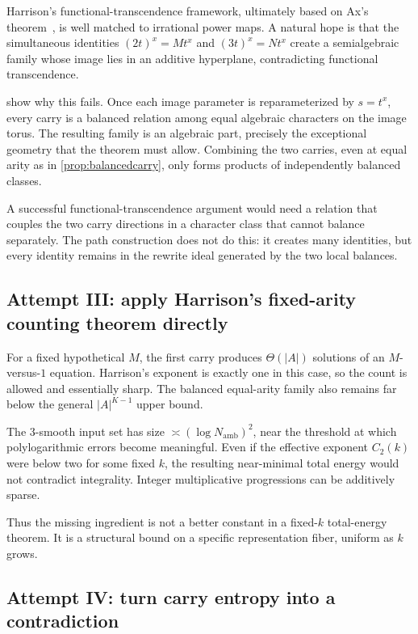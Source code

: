\documentclass[11pt,oneside]{article}
\theoremstyle{definition}
\begin{document}
Harrison's functional-transcendence framework, ultimately based on Ax's theorem~\cite{Ax1971,Harrison2026}, is well matched to irrational power maps.  A natural hope is that the simultaneous identities
$(2t)^x=Mt^x$ and $(3t)^x=Nt^x$ create a semialgebraic family whose image lies in an additive hyperplane, contradicting functional transcendence.

 show why this fails.  Once each image parameter is reparameterized by $s=t^x$, every carry is a balanced relation among equal algebraic characters on the image torus.  The resulting family is an algebraic part, precisely the exceptional geometry that the theorem must allow.  Combining the two carries, even at equal arity as in \cref{prop:balancedcarry}, only forms products of independently balanced classes.

A successful functional-transcendence argument would need a relation that couples the two carry directions in a character class that cannot balance separately.  The path construction does not do this: it creates many identities, but every identity remains in the rewrite ideal generated by the two local balances.

\subsection{Attempt III: apply Harrison's fixed-arity counting theorem directly}

For a fixed hypothetical $M$, the first carry produces $\Theta(|A|)$ solutions of an $M$-versus-$1$ equation.  Harrison's exponent is exactly one in this case, so the count is allowed and essentially sharp.  The balanced equal-arity family also remains far below the general $|A|^{K-1}$ upper bound.

The $3$-smooth input set has size $\asymp(\log N_{\mathrm{amb}})^2$, near the threshold at which polylogarithmic errors become meaningful.  Even if the effective exponent $C_2(k)$ were below two for some fixed $k$, the resulting near-minimal total energy would not contradict integrality.  Integer multiplicative progressions can be additively sparse.

Thus the missing ingredient is not a better constant in a fixed-$k$ total-energy theorem.  It is a structural bound on a specific representation fiber, uniform as $k$ grows.

\subsection{Attempt IV: turn carry entropy into a contradiction}
\end{document}
